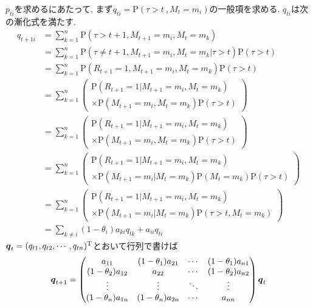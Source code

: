 $ p_{t i} $を求めるにあたって, まず$ q_{t i} = \mathrm{P}(\tau > t\ ,M_t = m_i) $の一般項を求める. 
$ q_{t i} $は次の漸化式を満たす. 
\begin{align}
    q_{t+1 i} & = \sum_{k=1}^n \mathrm{P}(\tau > t + 1 , M_{t+1} = m_i , M_t = m_k) \\
    & =\sum_{k=1}^n \mathrm{P}(\tau \ne t + 1 , M_{t+1} = m_i , M_t = m_k | \tau > t) \mathrm{P}(\tau > t) \\
    & =\sum_{k=1}^n \mathrm{P}(R_{t+1} = 1 , M_{t+1} = m_i , M_t = m_k) \mathrm{P}(\tau > t) \\
    & =\sum_{k=1}^n \left(
        \begin{array}{l}
            \mathrm{P}(R_{t+1} = 1 | M_{t+1} = m_i , M_t = m_k) \\
            \times \mathrm{P}(M_{t+1} = m_i , M_t = m_k) \mathrm{P}(\tau > t)
        \end{array}
    \right) \\
    & =\sum_{k=1}^n \left(
        \begin{array}{l}
            \mathrm{P}(R_{t+1} = 1 | M_{t+1} = m_i , M_t = m_k) \\
            \times \mathrm{P}(M_{t+1} = m_i , M_t = m_k) \mathrm{P}(\tau > t)
        \end{array}
    \right) \\
    & =\sum_{k=1}^n \left(
        \begin{array}{l}
            \mathrm{P}(R_{t+1} = 1 | M_{t+1} = m_i , M_t = m_k) \\
            \times \mathrm{P}(M_{t+1} = m_i | M_t = m_k) \mathrm{P}(M_t = m_k) \mathrm{P}(\tau > t)
        \end{array}
    \right) \\
    & =\sum_{k=1}^n \left(
        \begin{array}{l}
            \mathrm{P}(R_{t+1} = 1 | M_{t+1} = m_i , M_t = m_k) \\
            \times \mathrm{P}(M_{t+1} = m_i | M_t = m_k) \mathrm{P}(\tau > t , M_t = m_k)
        \end{array}
    \right) \\
    & =\sum_{k \ne i} (1 - \theta_i) a_{k i} q_{t k} + a_{i i} q_{t i} \label{eq:qti_rec}
\end{align}
$ \boldsymbol{q}_t = (q_{t 1} , q_{t 2} , \cdots , q_{t n})^\mathrm{T} $とおいて行列で書けば
\begin{equation}
    \boldsymbol{q}_{t + 1} =
    \begin{pmatrix}
        a_{1 1} & (1-\theta_1) a_{2 1} & \cdots & (1-\theta_1) a_{n 1} \\
        (1-\theta_2) a_{1 2} & a_{2 2} & \cdots & (1-\theta_2) a_{n 2} \\
        \vdots & \vdots & \ddots & \vdots \\
        (1-\theta_n) a_{1 n} & (1-\theta_n) a_{2 n} & \cdots & a_{n n} \\
    \end{pmatrix}
   \boldsymbol{q}_t
\end{equation}
